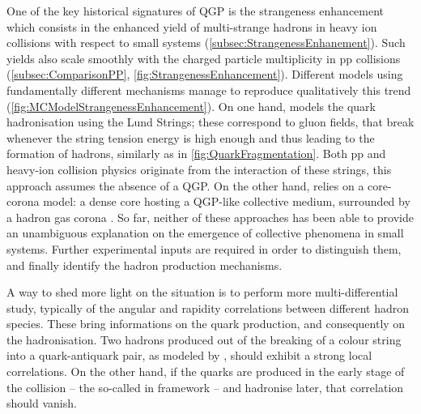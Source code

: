 One of the key historical signatures of QGP is the strangeness enhancement which consists in the enhanced yield of multi-strange hadrons in heavy ion collisions with respect to small systems (\Sec\ref{subsec:StrangenessEnhanement}). Such yields also scale smoothly with the charged particle multiplicity in pp collisions (\Sec\ref{subsec:ComparisonPP}, \fig\ref{fig:StrangenessEnhancement}). Different models using fundamentally different mechanisms manage to reproduce qualitatively this trend (\fig\ref{fig:MCModelStrangenessEnhancement}). On one hand, \Pythia models the quark hadronisation using the Lund Strings; these correspond to gluon fields, that break whenever the string tension energy is high enough and thus leading to the formation of hadrons, similarly as in \fig\ref{fig:QuarkFragmentation}. Both pp and heavy-ion collision physics originate from the interaction of these strings, \ie this approach assumes the absence of a QGP. On the other hand, \Epos relies on a core-corona model: a dense core hosting a QGP-like collective medium, surrounded by a hadron gas corona \cite{wernerAnalysingRadialFlow2014}. So far, neither of these approaches has been able to provide an unambiguous explanation on the emergence of collective phenomena in small systems. Further experimental inputs are required in order to distinguish them, and finally identify the hadron production mechanisms. 

A way to shed more light on the situation is to perform more multi-differential study, typically of the angular and rapidity correlations between different hadron species. These bring informations on the quark production, and consequently on the hadronisation. Two hadrons produced out of the breaking of a colour string into a quark-antiquark pair, as modeled by \Pythia, should exhibit a strong local correlations. On the other hand, if the quarks are produced in the early stage of the collision -- the so-called  in \Epos framework \cite{wernerCorecoronaProcedureMicrocanonical2023} -- and hadronise later, that correlation should vanish.

